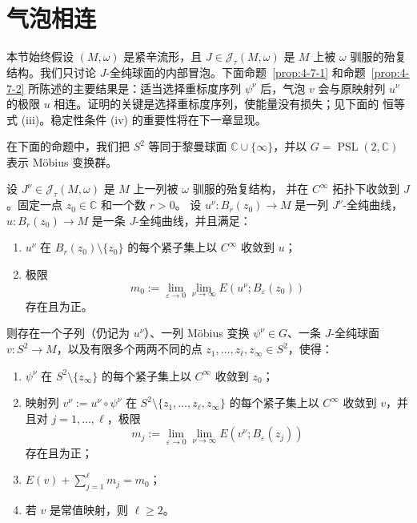 
\section{气泡相连}\label{sec:4-7}

本节始终假设 $(M,\omega)$ 是紧辛流形，且
$J\in\mathcal J_\tau(M,\omega)$ 是 $M$ 上被 $\omega$ 驯服的殆复结构。我们只讨论
$J$-全纯球面的内部冒泡。下面命题~\ref{prop:4-7-1} 和命题~\ref{prop:4-7-2}
所陈述的主要结果是：适当选择重标度序列 $\psi^\nu$ 后，气泡 $v$ 会与原映射列
$u^\nu$ 的极限 $u$ 相连。证明的关键是选择重标度序列，使能量没有损失；见下面的
恒等式 (iii)。稳定性条件 (iv) 的重要性将在下一章显现。

在下面的命题中，我们把 $S^2$ 等同于黎曼球面 $\mathbb C\cup\{\infty\}$，并以
$G=\operatorname{PSL}(2,\mathbb C)$ 表示 Möbius 变换群。

\begin{proposition}\label{prop:4-7-1}
设 $J^\nu\in\mathcal J_\tau(M,\omega)$ 是 $M$ 上一列被 $\omega$ 驯服的殆复结构，
并在 $C^\infty$ 拓扑下收敛到 $J$。固定一点 $z_0\in\mathbb C$ 和一个数 $r>0$。
设 $u^\nu:B_r(z_0)\to M$ 是一列 $J^\nu$-全纯曲线，
$u:B_r(z_0)\to M$ 是一条 $J$-全纯曲线，并且满足：
\begin{enumerate}[label=(\alph*),leftmargin=3em]
\item $u^\nu$ 在 $B_r(z_0)\setminus\{z_0\}$ 的每个紧子集上以 $C^\infty$ 收敛到 $u$；
\item 极限
\[
  m_0:=\lim_{\varepsilon\to0}\lim_{\nu\to\infty}
  E(u^\nu;B_\varepsilon(z_0))
\]
存在且为正。
\end{enumerate}
则存在一个子列（仍记为 $u^\nu$）、一列 Möbius 变换 $\psi^\nu\in G$、一条
$J$-全纯球面 $v:S^2\to M$，以及有限多个两两不同的点
$z_1,\ldots,z_\ell,z_\infty\in S^2$，使得：
\begin{enumerate}[label=(\roman*),leftmargin=3em]
\item $\psi^\nu$ 在 $S^2\setminus\{z_\infty\}$ 的每个紧子集上以 $C^\infty$
收敛到 $z_0$；
\item 映射列 $v^\nu:=u^\nu\circ\psi^\nu$ 在
$S^2\setminus\{z_1,\ldots,z_\ell,z_\infty\}$ 的每个紧子集上以 $C^\infty$
收敛到 $v$，并且对 $j=1,\ldots,\ell$，极限
\[
  m_j:=\lim_{\varepsilon\to0}\lim_{\nu\to\infty}
  E(v^\nu;B_\varepsilon(z_j))
\]
存在且为正；
\item $E(v)+\sum_{j=1}^{\ell}m_j=m_0$；
\item 若 $v$ 是常值映射，则 $\ell\ge2$。
\end{enumerate}
\end{proposition}

